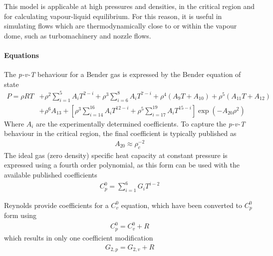 This model is applicable at high pressures and densities, in the critical region and
for calculating vapour-liquid equilibrium. For this reason, it is useful in
simulating flows which are thermodynamically close to or within the vapour dome,
such as turbomachinery and nozzle flows.

\paragraph{Equations}
The \textit{p-v-T} behaviour for a Bender gas is expressed by the Bender equation of state \cite{bender1975equations}
\begin{align}
P = \rho R T &+ \rho^2 \sum_{i=1}^5 A_i T^{2-i} + \rho^3 \sum_{i=6}^8 A_i T^{7-i} \nonumber
    + \rho^4 \left( A_9 T + A_{10} \right) + \rho^5 \left( A_{11} T + A_{12} \right)\\
   &+ \rho^6 A_{13} + \left[ \rho^3 \sum_{i=14}^{16} A_i T^{12-i}
    + \rho^5 \sum_{i=17}^{19} A_i T^{15-i} \right] \exp(-A_{20} \rho^2)
\end{align}
Where \(A_i\) are the experimentally determined coefficients. To capture the
\textit{p-v-T} behaviour in the critical region, the final coefficient is typically
published as
\begin{align}
A_{20} \approx \rho_c^{-2}
\end{align}
The ideal gas (zero density) specific heat capacity at constant pressure is
expressed using a fourth order polynomial, as this form can be used with
the available published coefficients
\cite{platzer1990thermophysical,polt1992bender,mclinden1989measurement,
    huber1992thermodynamic,outcalt1995equations,outcalt1996modified,
    outcalt1997equation,reynolds1979thermodynamic}
\begin{align} \label{eq:bender_cp0}
C_p^0 = \sum_{i=1}^6 G_i T^{i-2}
\end{align}

Reynolds \cite{reynolds1979thermodynamic} provide coefficients for a \(C_v^0\) equation,
which have been converted to \(C_p^0\) form using
\begin{align}
C_p^0 = C_v^0 + R
\end{align}
which results in only one coefficient modification
\begin{align}
G_{2,p} = G_{2,v} + R
\end{align}

